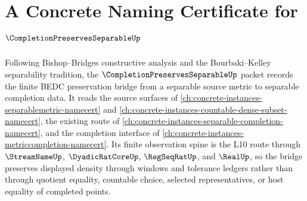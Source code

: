 \chapter{A Concrete Naming Certificate for $\CompletionPreservesSeparableUp$}
\label{ch:concrete-instances-completion-preserves-separable-namecert}

Following Bishop--Bridges constructive analysis and the Bourbaki--Kelley separability tradition, the $\CompletionPreservesSeparableUp$ packet records the finite BEDC preservation bridge from a separable source metric to separable completion data. It reads the source surfaces of \autoref{ch:concrete-instances-separablemetric-namecert} and \autoref{ch:concrete-instances-countable-dense-subset-namecert}, the existing route of \autoref{ch:concrete-instances-separable-completion-namecert}, and the completion interface of \autoref{ch:concrete-instances-metriccompletion-namecert}. Its finite observation spine is the L10 route through $\StreamNameUp$, $\DyadicRatCoreUp$, $\RegSeqRatUp$, and $\RealUp$, so the bridge preserves displayed density through windows and tolerance ledgers rather than through quotient equality, countable choice, selected representatives, or host equality of completed points.

